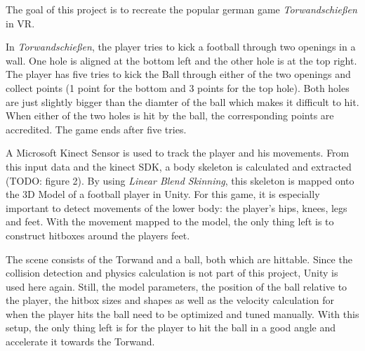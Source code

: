 \begin{multicols*}{2}



The goal of this project is to recreate the popular german game \textit{Torwandschießen} in VR. 


In \textit{Torwandschießen}, the player tries to kick a football through two openings in a wall.
One hole is aligned at the bottom left and the other hole is at the top right.
The player has five tries to kick the Ball through either of the two openings and collect points (1 point for the bottom and 3 points for the top hole).
Both holes are just slightly bigger than the diamter of the ball which makes it difficult to hit.
When either of the two holes is hit by the ball, the corresponding points are accredited.
The game ends after five tries.


A Microsoft Kinect Sensor is used to track the player and his movements.
From this input data and the kinect SDK, a body skeleton is calculated and extracted (TODO: figure 2).
By using \textit{Linear Blend Skinning}, this skeleton is mapped onto the 3D Model of a football player in Unity.
For this game, it is especially important to detect movements of the lower body: the player's hips, knees, legs and feet.
With the movement mapped to the model, the only thing left is to construct hitboxes around the players feet.

The scene consists of the Torwand and a ball, both which are hittable.
Since the collision detection and physics calculation is not part of this project, Unity is used here again. 
Still, the model parameters, the position of the ball relative to the player, the hitbox sizes and shapes as well as the velocity calculation for when the player hits the ball need to be optimized and tuned manually.
With this setup, the only thing left is for the player to hit the ball in a good angle and accelerate it towards the Torwand.


\columnbreak
{}

\end{multicols*}

